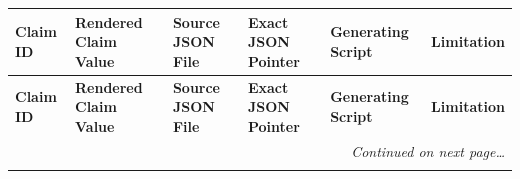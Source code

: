 \begin{center}
\begingroup
\scriptsize
\renewcommand{\arraystretch}{0.90}
\setlength{\tabcolsep}{2pt}
\renewcommand{\code}[1]{{\scriptsize\ttfamily\nolinkurl{#1}}}
\begin{longtable}{p{}>{\raggedright\arraybackslash}p{}>{\raggedright\arraybackslash}p{}>{\raggedright\arraybackslash}p{}>{\raggedright\arraybackslash}p{}>{\raggedright\arraybackslash}p{}}
\toprule
\textbf{Claim ID} & \textbf{Rendered Claim Value} & \textbf{Source JSON File} & \textbf{Exact JSON Pointer} & \textbf{Generating Script} & \textbf{Limitation} \\
\midrule
\endfirsthead
\toprule
\textbf{Claim ID} & \textbf{Rendered Claim Value} & \textbf{Source JSON File} & \textbf{Exact JSON Pointer} & \textbf{Generating Script} & \textbf{Limitation} \\
\midrule
\endhead
\midrule
\multicolumn{6}{r}{\textit{Continued on next page\dots}} \\
\bottomrule
\endfoot
\bottomrule
\endlastfoot


\end{longtable}
\end{center}
